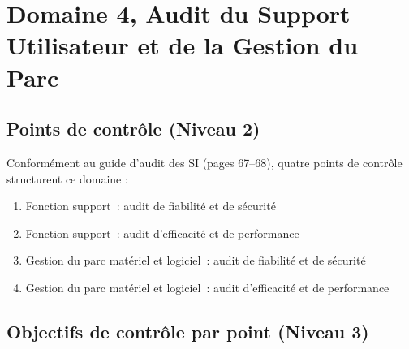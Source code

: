 \section{Domaine 4, Audit du Support Utilisateur et de la Gestion du Parc}
\label{sec:decomp-support}

\subsection{Points de contrôle (Niveau 2)}

Conformément au guide d'audit des SI (pages 67--68), quatre points de contrôle structurent ce domaine :

\begin{enumerate}
    \item Fonction support~: audit de fiabilité et de sécurité
    \item Fonction support~: audit d'efficacité et de performance
    \item Gestion du parc matériel et logiciel~: audit de fiabilité et de sécurité
    \item Gestion du parc matériel et logiciel~: audit d'efficacité et de performance
\end{enumerate}

\subsection{Objectifs de contrôle par point (Niveau 3)}

